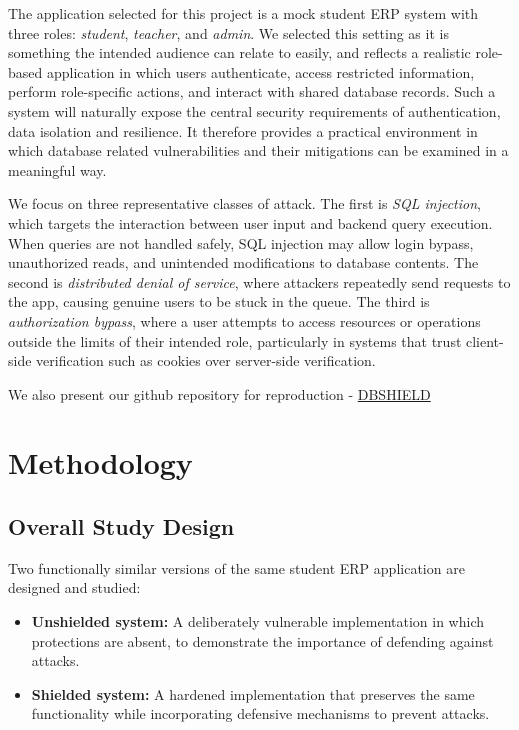 \documentclass[11pt,a4paper]{article}
\begin{document}
The application selected for this project is a mock student ERP system with three roles: \textit{student}, \textit{teacher}, and \textit{admin}. We selected this setting as it is something the intended audience can relate to easily, and reflects a realistic role-based application in which users authenticate, access restricted information, perform role-specific actions, and interact with shared database records. Such a system will naturally expose the central security requirements of authentication, data isolation and resilience. It therefore provides a practical environment in which database related vulnerabilities and their mitigations can be examined in a meaningful way.

We focus on three representative classes of attack. The first is \textit{SQL injection}, which targets the interaction between user input and backend query execution. When queries are not handled safely, SQL injection may allow login bypass, unauthorized reads, and unintended modifications to database contents. The second is \textit{distributed denial of service}, where attackers repeatedly send requests to the app, causing genuine users to be stuck in the queue. The third is \textit{authorization bypass}, where a user attempts to access resources or operations outside the limits of their intended role, particularly in systems that trust client-side verification such as cookies over server-side verification.

We also present our github repository for reproduction - \href{https://github.com/krishna-prabu-kgpian/DBSHIELD}{DBSHIELD}

\section{Methodology}

\subsection{Overall Study Design}

Two functionally similar versions of the same student ERP application are designed and studied:

\begin{itemize}
    \item \textbf{Unshielded system:} A deliberately vulnerable implementation in which protections are absent, to demonstrate the importance of defending against attacks.
    \item \textbf{Shielded system:} A hardened implementation that preserves the same functionality while incorporating defensive mechanisms to prevent attacks.
\end{itemize}
\end{document}
